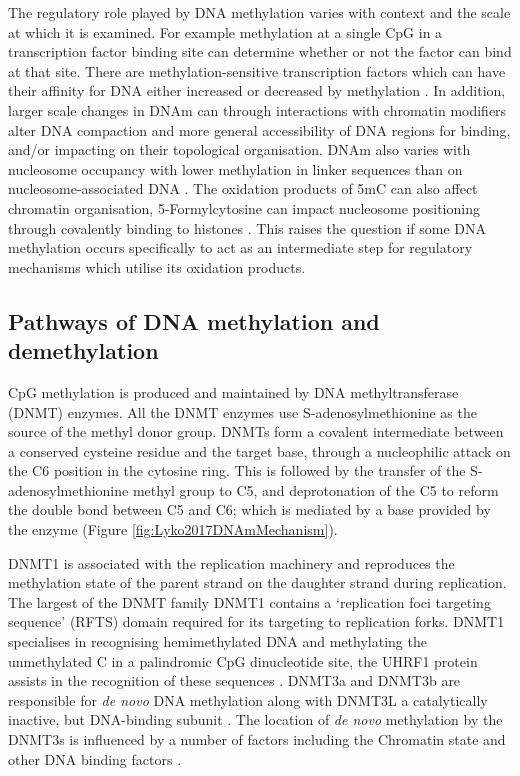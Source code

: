 \documentclass[]{book}
\begin{document}
The regulatory role played by DNA methylation varies with context and the scale at which it is examined. For example methylation at a single CpG in a transcription factor binding site can determine whether or not the factor can bind at that site. There are methylation-sensitive transcription factors which can have their affinity for DNA either increased or decreased by methylation \citep[\citet{Zuo2017}]{Yin2017}. In addition, larger scale changes in DNAm can through interactions with chromatin modifiers alter DNA compaction and more general accessibility of DNA regions for binding, and/or impacting on their topological organisation. DNAm also varies with nucleosome occupancy with lower methylation in linker sequences than on nucleosome-associated DNA \citep[\citet{Huff2014}]{Kelly2012}. The oxidation products of 5mC can also affect chromatin organisation, 5-Formylcytosine can impact nucleosome positioning through covalently binding to histones \citep{Raiber2017}. This raises the question if some DNA methylation occurs specifically to act as an intermediate step for regulatory mechanisms which utilise its oxidation products.

\hypertarget{pathways-of-dna-methylation-and-demethylation}{%
\subsection{Pathways of DNA methylation and demethylation}\label{pathways-of-dna-methylation-and-demethylation}}

CpG methylation is produced and maintained by DNA methyltransferase (DNMT) enzymes. All the DNMT enzymes use S-adenosylmethionine as the source of the methyl donor group. DNMTs form a covalent intermediate between a conserved cysteine residue and the target base, through a nucleophilic attack on the C6 position in the cytosine ring. This is followed by the transfer of the S-adenosylmethionine methyl group to C5, and deprotonation of the C5 to reform the double bond between C5 and C6; which is mediated by a base provided by the enzyme (Figure \ref{fig:Lyko2017DNAmMechanism}).

DNMT1 is associated with the replication machinery \citep{Vertino2002} and reproduces the methylation state of the parent strand on the daughter strand during replication. The largest of the DNMT family DNMT1 contains a `replication foci targeting sequence' (RFTS) domain required for its targeting to replication forks. DNMT1 specialises in recognising hemimethylated DNA and methylating the unmethylated C in a palindromic CpG dinucleotide site, the UHRF1 protein assists in the recognition of these sequences \citep{Bostick2007}. DNMT3a and DNMT3b are responsible for \emph{de novo} DNA methylation along with DNMT3L a catalytically inactive, but DNA-binding subunit \citep{Jia2009}. The location of \emph{de novo} methylation by the DNMT3s is influenced by a number of factors including the Chromatin state and other DNA binding factors \citep{Lyko2017}.
\end{document}
